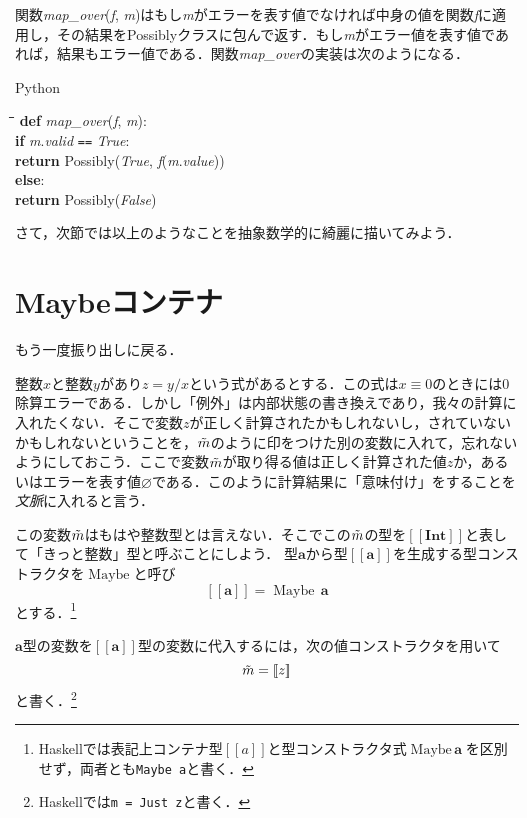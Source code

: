 \documentclass[twocolumn]{jsbook}
\def\[{[\![}
\def\]{]\!]}
\newcommand{\keyword}[1]{{\emph{#1}}}
\newcommand{\code}[1]{\texttt{#1}}
\newenvironment{pythoncode}{\begin{itembox}[r]{Python}}{\end{itembox}}
\newenvironment{python}{\begin{tabbing}\hspace*{1em}\=\hspace*{1em}\=\hspace*{1em}\=\hspace*{1em}\=\kill}{\end{tabbing}}
\newcommand{\pthnClassname}[1]{\textrm{#1}}
\newcommand{\pthnId}[1]{\textit{#1}}
\newcommand{\pthnKeyword}[1]{\textbf{#1}}
\newcommand{\pthnOp}[1]{\texttt{#1}}
\newcommand{\hsklType}[1]{\textbf{#1}}
\newcommand{\hsklTypeConstructor}[1]{\mathop{\mathrm{#1}}}
\DeclareMathOperator{\hsklMaybeConstructor}{\hsklTypeConstructor{Maybe}}
\newcommand{\hsklInt}{\hsklType{Int}}
\newcommand{\hsklNothing}{\varnothing}
\newcommand{\hsklJust}[1]{\[#1\]}
\newcommand{\hsklMaybe}[1]{\Tilde{#1}}
\newcommand{\hsklMaybeType}[1]{\[#1\]}
\newcommand{\hsklTypeConstruct}[2]{#1\,#2}
\begin{document}
関数\pthnId{map\_over}(\pthnId{f}, \pthnId{m})はもし\pthnId{m}がエラーを表す値でなければ中身の値を関数\pthnId{f}に適用し，その結果を\pthnClassname{Possibly}クラスに包んで返す．もし\pthnId{m}がエラー値を表す値であれば，結果もエラー値である．関数\pthnId{map\_over}の実装は次のようになる．
\begin{pythoncode}
\begin{python}
\pthnKeyword{def} \pthnId{map\_over}(\pthnId{f}, \pthnId{m}):\\
\>\pthnKeyword{if} \pthnId{m}.\pthnId{valid} \pthnOp{==} \pthnId{True}:\\
\>\>\pthnKeyword{return} \pthnClassname{Possibly}(\pthnId{True}, \pthnId{f}(\pthnId{m}.\pthnId{value}))\\
\>\pthnKeyword{else}:\\
\>\>\pthnKeyword{return} \pthnClassname{Possibly}(\pthnId{False})
\end{python}
\end{pythoncode}

さて，次節では以上のようなことを抽象数学的に綺麗に描いてみよう．

\section{Maybeコンテナ}

もう一度振り出しに戻る．

整数$x$と整数$y$があり$z=y/x$という式があるとする．この式は$x\equiv0$のときには$0$除算エラーである．しかし「例外」は内部状態の書き換えであり，我々の計算に入れたくない．そこで変数$z$が正しく計算されたかもしれないし，されていないかもしれないということを，$\hsklMaybe{m}$のように印をつけた別の変数に入れて，忘れないようにしておこう．ここで変数$\hsklMaybe{m}$が取り得る値は正しく計算された値$z$か，あるいはエラーを表す値$\hsklNothing$である．このように計算結果に「意味付け」をすることを\keyword{文脈}に入れると言う．

この変数$\hsklMaybe{m}$はもはや整数型とは言えない．そこでこの$\hsklMaybe{m}$の型を$\hsklMaybeType{\hsklInt}$と表して「きっと整数」型と呼ぶことにしよう．
型$\hsklType{a}$から型$\hsklMaybeType{\hsklType{a}}$を生成する型コンストラクタを$\hsklMaybeConstructor$と呼び$$\hsklMaybeType{\hsklType{a}}=\hsklTypeConstruct{\hsklMaybeConstructor}{\hsklType{a}}$$とする．\footnote{Haskellでは表記上コンテナ型$\hsklMaybeType{a}$と型コンストラクタ式$\hsklTypeConstruct{\hsklMaybeConstructor}{\hsklType{a}}$を区別せず，両者とも\code{Maybe a}と書く．}

$\hsklType{a}$型の変数を$\hsklMaybeType{\hsklType{a}}$型の変数に代入するには，次の値コンストラクタを用いて$$\hsklMaybe{m}=\hsklJust{z}$$と書く．\footnote{Haskellでは\code{m = Just z}と書く．}
\end{document}
